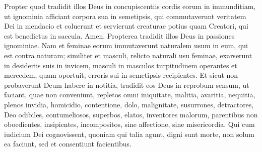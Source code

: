 \begin{biblechapter}
 \verse Propter quod tradidit illos Deus in concupiscentiis cordis eorum in immunditiam, ut ignominia afficiant corpora sua in semetipsis, 
\verse qui commutaverunt veritatem Dei in mendacio et coluerunt et servierunt creaturae potius quam Creatori, qui est benedictus in saecula. Amen.
 \verse Propterea tradidit illos Deus in passiones ignominiae. Nam et feminae eorum immutaverunt naturalem usum in eum, qui est contra naturam; 
\verse similiter et masculi, relicto naturali usu feminae, exarserunt in desideriis suis in invicem, masculi in masculos turpitudinem operantes et mercedem, quam oportuit, erroris sui in semetipsis recipientes. 
\verse Et sicut non probaverunt Deum habere in notitia, tradidit eos Deus in reprobum sensum, ut faciant, quae non conveniunt, 
\verse repletos omni iniquitate, malitia, avaritia, nequitia, plenos invidia, homicidio, contentione, dolo, malignitate, susurrones, 
\verse detractores, Deo odibiles, contumeliosos, superbos, elatos, inventores malorum, parentibus non oboedientes, 
\verse insipientes, incompositos, sine affectione, sine misericordia. 
\verse Qui cum iudicium Dei cognovissent, quoniam qui talia agunt, digni sunt morte, non solum ea faciunt, sed et consentiunt facientibus.
 

\end{biblechapter}
